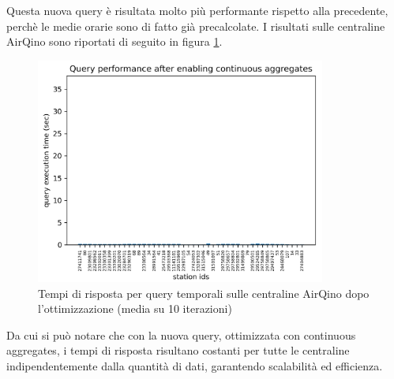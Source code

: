 Questa nuova query è risultata molto più performante rispetto alla precedente, perchè le medie orarie sono di fatto già precalcolate. I risultati sulle centraline AirQino sono riportati di seguito in figura \ref{fig:query-dopo}.

\begin{figure}[H]
\centering
\captionsetup{justification=centering}
\includegraphics[width=0.85\textwidth,height=\textheight,keepaspectratio]{img/query_dopo}
\caption{Tempi di risposta per query temporali sulle centraline AirQino dopo l'ottimizzazione (media su 10 iterazioni)}
\label{fig:query-dopo}
\end{figure}

Da cui si può notare che con la nuova query, ottimizzata con continuous aggregates, i tempi di risposta risultano costanti per tutte le centraline indipendentemente dalla quantità di dati, garantendo scalabilità ed efficienza.
